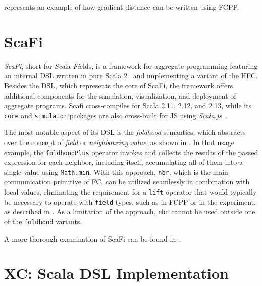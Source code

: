  represents an example of how gradient distance can be written using FCPP.



\section{ScaFi} \label{chap:state-of-the-art->sec:scafi}

\textit{ScaFi}, short for \textit{Sca}la \textit{Fi}elds, is a framework for aggregate programming featuring an internal \ac{DSL} written in pure Scala 2~\cite{scafi} and implementing a variant of the \ac{HFC}.
%
Besides the \ac{DSL}, which represents the core of ScaFi, the framework offers additional components for the simulation, visualization, and deployment of aggregate programs.
%
Scafi cross-compiles for Scala 2.11, 2.12, and 2.13, while its \texttt{core} and \texttt{simulator} packages are also cross-built for \ac{JS} using \textit{Scala.js}~\cite{scala-js}.

The most notable aspect of its \ac{DSL} is the \textit{foldhood} semantics, which abstracts over the concept of \textit{field} or \textit{neighbouring value}, as shown in .
%
In that usage example, the \texttt{foldhoodPlus} operator invokes and collects the results of the passed expression for each neighbor, including itself, accumulating all of them into a single value using \texttt{Math.min}.
%
With this approach, \texttt{nbr}, which is the main communication primitive of \ac{FC}, can be utilized seamlessly in combination with local values, eliminating the requirement for a \texttt{lift} operator that would typically be necessary to operate with \texttt{field} types, such as in FCPP or in the  experiment, as described in .
%
As a limitation of the approach, \texttt{nbr} cannot be used outside one of the \texttt{foldhood} variants.



A more thorough examination of ScaFi can be found in .

\section{XC: Scala DSL Implementation} \label{chap:state-of-the-art->sec:xc-experiment}


